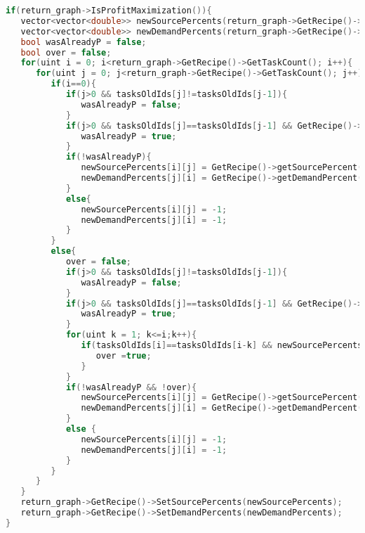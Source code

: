 \begin{lstlisting}[language=C++, caption={FlexBatchSchProblem osztály adattagjai}, frame={single}]
if(return_graph->IsProfitMaximization()){
   vector<vector<double>> newSourcePercents(return_graph->GetRecipe()->GetTaskCount(), vector<double>(return_graph->GetRecipe()->GetTaskCount(),0));
   vector<vector<double>> newDemandPercents(return_graph->GetRecipe()->GetTaskCount(), vector<double>(return_graph->GetRecipe()->GetTaskCount(),0));
   bool wasAlreadyP = false;
   bool over = false;
   for(uint i = 0; i<return_graph->GetRecipe()->GetTaskCount(); i++){
      for(uint j = 0; j<return_graph->GetRecipe()->GetTaskCount(); j++){
         if(i==0){
            if(j>0 && tasksOldIds[j]!=tasksOldIds[j-1]){
               wasAlreadyP = false;
            }
            if(j>0 && tasksOldIds[j]==tasksOldIds[j-1] && GetRecipe()->getSourcePercent(tasksOldIds[i],tasksOldIds[j])!=-1 && !wasAlreadyP){
               wasAlreadyP = true;
            }
            if(!wasAlreadyP){
               newSourcePercents[i][j] = GetRecipe()->getSourcePercent(tasksOldIds[i],tasksOldIds[j]);
               newDemandPercents[j][i] = GetRecipe()->getDemandPercent(tasksOldIds[j],tasksOldIds[i]);
            }
            else{
               newSourcePercents[i][j] = -1;
               newDemandPercents[j][i] = -1;
            }
         }
         else{
            over = false;
            if(j>0 && tasksOldIds[j]!=tasksOldIds[j-1]){
               wasAlreadyP = false;
            }
            if(j>0 && tasksOldIds[j]==tasksOldIds[j-1] && GetRecipe()->getSourcePercent(tasksOldIds[i],tasksOldIds[j])!=-1 && !wasAlreadyP &&newSourcePercents[i][j-1]!=-1){
               wasAlreadyP = true;
            }
            for(uint k = 1; k<=i;k++){
               if(tasksOldIds[i]==tasksOldIds[i-k] && newSourcePercents[i-k][j]!=-1 ){
                  over =true;
               }
            }
            if(!wasAlreadyP && !over){
               newSourcePercents[i][j] = GetRecipe()->getSourcePercent(tasksOldIds[i],tasksOldIds[j]);
               newDemandPercents[j][i] = GetRecipe()->getDemandPercent(tasksOldIds[j],tasksOldIds[i]);
            }
            else {
               newSourcePercents[i][j] = -1;
               newDemandPercents[j][i] = -1;
            }
         }
      }
   }
   return_graph->GetRecipe()->SetSourcePercents(newSourcePercents);
   return_graph->GetRecipe()->SetDemandPercents(newDemandPercents);
}
\end{lstlisting}

